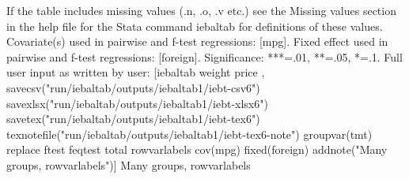 If the table includes missing values (.n, .o, .v etc.) see the Missing values section in the help file for the Stata command iebaltab for definitions of these values. Covariate(s) used in pairwise and f-test regressions: [mpg]. Fixed effect used in pairwise and f-test regressions: [foreign]. Significance: ***=.01, **=.05, *=.1. Full user input as written by user: [iebaltab weight price , savecsv("run/iebaltab/outputs/iebaltab1/iebt-csv6") savexlsx("run/iebaltab/outputs/iebaltab1/iebt-xlsx6") savetex("run/iebaltab/outputs/iebaltab1/iebt-tex6") texnotefile("run/iebaltab/outputs/iebaltab1/iebt-tex6-note") groupvar(tmt) replace ftest feqtest total rowvarlabels cov(mpg) fixed(foreign) addnote("Many groups, rowvarlabels")] Many groups, rowvarlabels
